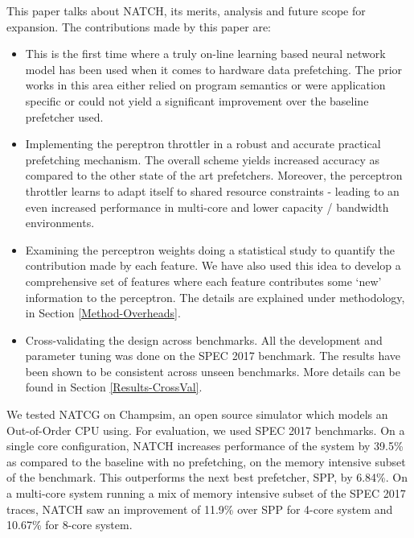\vspace{1ex}This paper talks about NATCH, its merits, analysis and
future scope for expansion.  The contributions made by this paper are:

\begin{itemize}
\item This is the first time where a truly on-line learning based
  neural network model has been used when it comes to hardware data
  prefetching.  The prior works in this area either relied on program
  semantics\cite{Semantics} or were application
  specific\cite{Datacenter} or could not yield a significant
  improvement over the baseline prefetcher used\cite{BadPerc}.

\item Implementing the pereptron throttler in a robust and accurate
  practical prefetching mechanism.  The overall scheme yields
  increased accuracy as compared to the other state of the art
  prefetchers.  Moreover, the perceptron throttler learns to adapt
  itself to shared resource constraints - leading to an even increased
  performance in multi-core and lower capacity / bandwidth
  environments.

\item Examining the perceptron weights doing a statistical study to
  quantify the contribution made by each feature.  We have also used
  this idea to develop a comprehensive set of features where each
  feature contributes some `new' information to the perceptron.  The
  details are explained under methodology, in Section \ref{Method-Overheads}.

\item Cross-validating the design across benchmarks.  All the
  development and parameter tuning was done on the SPEC 2017
  benchmark.  The results have been shown to be consistent across
  unseen benchmarks.  More details can be found in Section \ref{Results-CrossVal}.

\end{itemize}

We tested NATCG on Champsim, an open source simulator which models
an Out-of-Order CPU using.  For evaluation, we used SPEC 2017
benchmarks.  On a single core configuration, NATCH increases
performance of the system by 39.5\% as compared to the baseline with
no prefetching, on the memory intensive subset of the benchmark.  This
outperforms the next best prefetcher, SPP, by 6.84\%.  On a multi-core
system running a mix of memory intensive subset of the SPEC 2017
traces, NATCH saw an improvement of 11.9\% over SPP for 4-core
system and 10.67\% for 8-core system.

